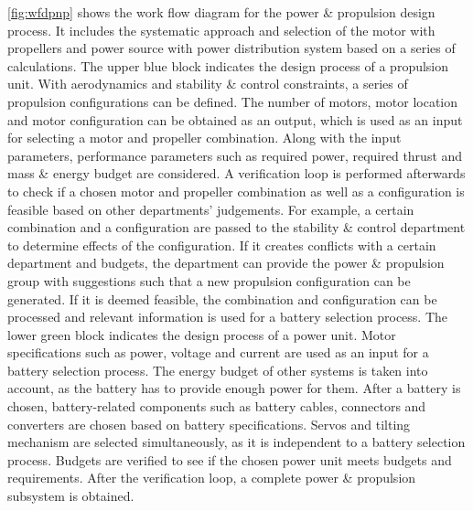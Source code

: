 \autoref{fig:wfdpnp} shows the work flow diagram for the power \& propulsion design process. It includes the systematic approach and selection of the motor with propellers and power source with power distribution system based on a series of calculations. The upper blue block indicates the design process of a propulsion unit. With aerodynamics and stability \& control constraints, a series of propulsion configurations can be defined. The number of motors, motor location and motor configuration can be obtained as an output, which is used as an input for selecting a motor and propeller combination. Along with the input parameters, performance parameters such as required power, required thrust and mass \& energy budget are considered. A verification loop is performed afterwards to check if a chosen motor and propeller combination as well as a configuration is feasible based on other departments' judgements. For example, a certain combination and a configuration are passed to the stability \& control department to determine effects of the configuration. If it creates conflicts with a certain department and budgets, the department can provide the power \& propulsion group with suggestions such that a new propulsion configuration can be generated. If it is deemed feasible, the combination and configuration can be processed and relevant information is used for a battery selection process.
The lower green block indicates the design process of a power unit. Motor specifications such as power, voltage and current are used as an input for a battery selection process. The energy budget of other systems is taken into account, as the battery has to provide enough power for them. After a battery is chosen, battery-related components such as battery cables, connectors and converters are chosen based on battery specifications. Servos and tilting mechanism are selected simultaneously, as it is independent to a battery selection process. Budgets are verified to see if the chosen power unit meets budgets and requirements. After the verification loop, a complete power \& propulsion subsystem is obtained. %



